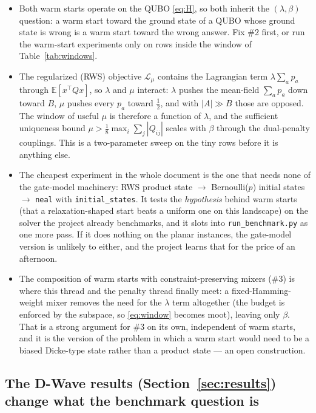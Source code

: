 \documentclass[11pt]{article}
\newcommand{\code}[1]{\texttt{#1}}
\begin{document}
\begin{itemize}[leftmargin=1.5em]
\item Both warm starts operate on the QUBO \eqref{eq:H}, so both inherit the $(\lambda,\beta)$ question: a warm start toward the ground state of a QUBO whose ground state is wrong is a warm start toward the wrong answer. Fix \#2 first, or run the warm-start experiments only on rows inside the window of Table~\ref{tab:windows}.
\item The regularized (RWS) objective $\mathcal L_\mu$ contains the Lagrangian term $\lambda\sum_a p_a$ through $\mathbb{E}[x^\top Q x]$, so $\lambda$ and $\mu$ interact: $\lambda$ pushes the mean-field $\sum_a p_a$ down toward $B$, $\mu$ pushes every $p_a$ toward $\tfrac12$, and with $|A| \gg B$ those are opposed. The window of useful $\mu$ is therefore a function of $\lambda$, and the sufficient uniqueness bound $\mu > \tfrac18 \max_i \sum_j |Q_{ij}|$ scales with $\beta$ through the dual-penalty couplings. This is a two-parameter sweep on the tiny rows before it is anything else.
\item The cheapest experiment in the whole document is the one that needs none of the gate-model machinery: RWS product state $\to$ Bernoulli($p$) initial states $\to$ \code{neal} with \code{initial\_states}. It tests the \emph{hypothesis} behind warm starts (that a relaxation-shaped start beats a uniform one on this landscape) on the solver the project already benchmarks, and it slots into \code{run\_benchmark.py} as one more pass. If it does nothing on the planar instances, the gate-model version is unlikely to either, and the project learns that for the price of an afternoon.
\item The composition of warm starts with constraint-preserving mixers (\#3) is where this thread and the penalty thread finally meet: a fixed-Hamming-weight mixer removes the need for the $\lambda$ term altogether (the budget is enforced by the subspace, so \eqref{eq:window} becomes moot), leaving only $\beta$. That is a strong argument for \#3 on its own, independent of warm starts, and it is the version of the problem in which a warm start would need to be a biased Dicke-type state rather than a product state --- an open construction.
\end{itemize}

\subsection*{The D-Wave results (Section~\ref{sec:results}) change what the benchmark question is}
\end{document}
